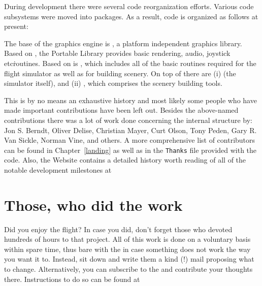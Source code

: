 During development there were several code reorganization efforts. Various code
subsystems were moved into packages. As a result, code is organized as follows at present:
\medskip

The base of the graphics engine is \textbf{}, a platform independent
graphics library. Based on , the Portable Library \PLIB{}
provides basic rendering, audio, joystick etc\. routines. Based on \PLIB{} is
\SimGear{}, which includes all of the basic routines required for the
flight simulator as well as for building scenery. On top of \SimGear{}
there are (i) \FlightGear{} (the simulator itself), and (ii)
\TerraGear{}, which comprises the scenery building tools.

This is by no means an exhaustive history and most likely some people who have made
important contributions have been left out. Besides the above-named contributions there
was a lot of work done concerning the internal structure by: Jon S. Berndt, Oliver Delise,  Christian Mayer, 
Curt Olson, Tony Peden,  Gary R. Van
Sickle, Norman Vine, and others. A more
comprehensive list of contributors can be found in Chapter~\ref{landing} as well as in
the \texttt{Thanks} file provided with the code. Also, the \FlightGear{}
Website contains a detailed history worth reading of all of the
notable development milestones at
 \medskip


\section{Those, who did the work}

Did you enjoy the flight? In case you did, don't forget those who devoted hundreds of
hours to that project. All of this work is done on a voluntary basis within spare time,
thus bare with the  in case something does not work the way you want
it to. Instead, sit down and write them a kind (!) mail proposing what to change.
Alternatively, you can subscribe to the \FlightGear{}  and
contribute your thoughts there. Instructions to do so can be found at
 \medskip

